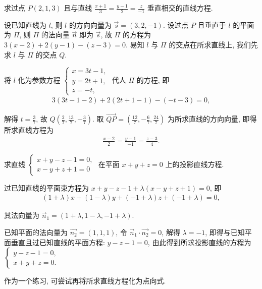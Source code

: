 \begin{example}
	求过点 $P(2,1,3)$ 且与直线 $\frac{x+1}{3}=\frac{y-1}{2}=\frac{z}{-1}$ 垂直相交的直线方程.
\end{example}
\begin{solution}
	设已知直线为 $l$, 则 $l$ 的方向向量为 $\vec{s}=(3,2,-1)$.
	设过点 $P$ 且垂直于 $l$ 的平面为 $\Pi$, 则 $\Pi$ 的法向量 $\vec{n}$ 即为 $\vec{s}$, 故 $\Pi$ 的方程为 $3(x-2)+2(y-1)-(z-3)=0$.
	易知 $l$ 与 $\Pi$ 的交点在所求直线上, 我们先求 $l$ 与 $\Pi$ 的交点 $Q$.

	将 $l$ 化为参数方程 $\left\{\begin{array}{l}x=3 t-1, \\ y=2 t+1, \\ z=-t,\end{array}\right.$ 代人 $\Pi$ 的方程, 即
	\begin{align*}
		3(3 t-1-2)+2(2 t+1-1)-(-t-3)=0,
	\end{align*}

	解得 $t=\frac{3}{7}$, 故 $Q\left(\frac{2}{7}, \frac{13}{7},-\frac{3}{7}\right)$.
	取 $\overrightarrow{Q P}=\left(\frac{12}{7},-\frac{6}{7}, \frac{24}{7}\right)$ 为所求直线的方向向量, 即得所求直线方程为
	\begin{align*}
		\frac{x-2}{2}=\frac{y-1}{-1}=\frac{z-3}{4} .
	\end{align*}
\end{solution}

\begin{example}
	求直线 $\left\{\begin{array}{l}x+y-z-1=0, \\ x-y+z+1=0\end{array}\right.$ 在平面 $x+y+z=0$ 上的投影直线方程.
\end{example}
\begin{solution}
	过已知直线的平面束方程为 $x+y-z-1+\lambda(x-y+z+1)=0$, 即
	\begin{align*}
		(1+\lambda) x+(1-\lambda) y+(-1+\lambda) z+(-1+\lambda)=0,
	\end{align*}

	其法向量为 $\vec{n}_1=(1+\lambda, 1-\lambda,-1+\lambda)$.

	已知平面的法向量为 $\overrightarrow{n_2}=(1,1,1)$, 令 $\vec{n}_1 \cdot \overrightarrow{n_2}=0$, 解得 $\lambda=-1$, 即得与已知平面垂直且过已知直线的平面方程: $y-z-1=0$, 由此得到所求投影直线的方程为 $\left\{\begin{array}{l}y-z-1=0, \\ x+y+z=0 .\end{array}\right.$
\end{solution}
\begin{note}
	作为一个练习, 可尝试再将所求直线方程化为点向式.
\end{note}

